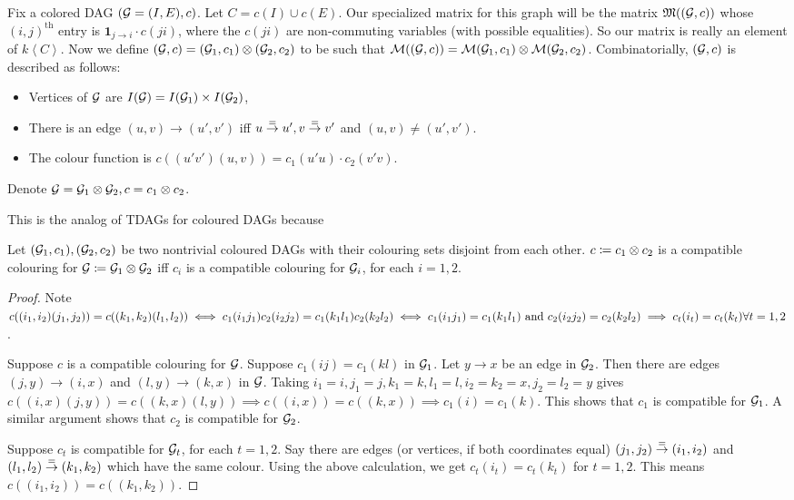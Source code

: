 Fix a colored DAG $({\mathcal{G}} = (I,E),c)$. Let $C = c(I)\cup c(E)$. Our specialized matrix for this graph will be the matrix ${\mathfrak{M}}(({\mathcal{G}},c))$ whose $(i,j)^{\text{th}}$ entry is $\pmb 1_{j\to i}\cdot c(ji)$, where the $c(ji)$ are non-commuting variables (with possible equalities). So our matrix is really an element of $k\left<C\right>$. Now we define $({\mathcal{G}},c) = ({\mathcal{G}}_1,c_1)\otimes ({\mathcal{G}}_2,c_2)$ to be such that ${\mathcal{M}}(({\mathcal{G}},c)) = {\mathcal{M}}({\mathcal{G}}_1,c_1)\otimes {\mathcal{M}}({\mathcal{G}}_2,c_2)$. Combinatorially, $({\mathcal{G}},c)$ is described as follows:
\begin{itemize}[itemsep=0pt]
\item Vertices of ${\mathcal{G}}$ are $I({\mathcal{G}})= I({\mathcal{G}}_1)\times I({\mathcal{G}}_2)$,
\item There is an edge $(u,v)\to (u',v')$ iff $u\stackrel{=}{\to} u', v\stackrel{=}{\to} v'$ and $(u,v)\neq (u',v')$.
\item The colour function is $c((u'v')(u,v)) = c_1(u'u)\cdot c_2(v'v)$.
\end{itemize}
Denote ${\mathcal{G}} = {\mathcal{G}}_1\otimes {\mathcal{G}}_2, c=c_1\otimes c_2$.

This is the analog of TDAGs for coloured DAGs because 
\begin{prop}
Let $({\mathcal{G}}_1,c_1), ({\mathcal{G}}_2,c_2)$ be two nontrivial coloured DAGs with their colouring sets disjoint from each other. $c\coloneqq c_1\otimes c_2$ is a compatible colouring for ${\mathcal{G}}\coloneqq {\mathcal{G}}_1\otimes {\mathcal{G}}_2$ iff $c_i$ is a compatible colouring for ${\mathcal{G}}_i$, for each $i=1,2$.
\end{prop}

\begin{proof}
Note $c((i_1,i_2)(j_1,j_2)) = c((k_1,k_2)(l_1,l_2)) \iff c_1(i_1j_1)c_2(i_2j_2) = c_1(k_1l_1)c_2(k_2l_2) \\\iff c_1(i_1j_1) = c_1(k_1l_1) \text{ and } c_2(i_2j_2) = c_2(k_2l_2)\implies c_t(i_t)=c_t(k_t)\forall t=1,2$.

Suppose $c$ is a compatible colouring for ${\mathcal{G}}$. Suppose $c_1(ij) = c_1(kl)$ in ${\mathcal{G}}_1$. Let $y\to x$ be an edge in ${\mathcal{G}}_2$. Then there are edges $(j,y)\to (i,x)$ and $(l,y)\to (k,x)$ in ${\mathcal{G}}$. Taking $i_1=i, j_1=j, k_1=k, l_1=l, i_2=k_2=x, j_2=l_2=y$ gives $c((i,x)(j,y)) = c((k,x)(l,y)) \implies c((i,x)) = c((k,x))\implies c_1(i) = c_1(k)$. This shows that $c_1$ is compatible for ${\mathcal{G}}_1$. A similar argument shows that $c_2$ is compatible for ${\mathcal{G}}_2$.

Suppose $c_t$ is compatible for ${\mathcal{G}}_t$, for each $t=1,2$. Say there are edges (or vertices, if both coordinates equal) $(j_1,j_2)\stackrel{=}{\to} (i_1,i_2)$ and $(l_1,l_2)\stackrel{=}{\to}(k_1,k_2)$ which have the same colour. Using the above calculation, we get $c_t(i_t) = c_t(k_t)$ for $t=1,2$. This means $c((i_1,i_2)) = c((k_1,k_2))$.
\hfill\end{proof}

